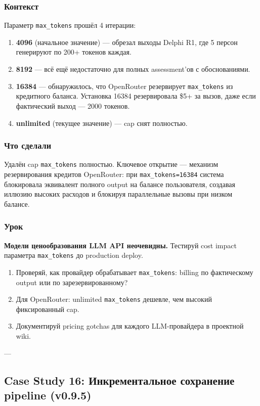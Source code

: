\subsubsection*{Контекст}
Параметр \texttt{max\_tokens} прошёл 4 итерации:
\begin{enumerate}
\item \textbf{4096} (начальное значение) --- обрезал выходы Delphi R1, где 5 персон генерируют по 200+ токенов каждая.
\item \textbf{8192} --- всё ещё недостаточно для полных assessment'ов с обоснованиями.
\item \textbf{16384} --- обнаружилось, что OpenRouter резервирует \texttt{max\_tokens} из кредитного баланса. Установка 16384 резервировала \$5+ за вызов, даже если фактический выход --- 2000 токенов.
\item \textbf{unlimited} (текущее значение) --- cap снят полностью.
\end{enumerate}

\subsubsection*{Что сделали}
Удалён cap \texttt{max\_tokens} полностью. Ключевое открытие --- механизм резервирования кредитов OpenRouter: при \texttt{max\_tokens=16384} система блокировала эквивалент полного output на балансе пользователя, создавая иллюзию высоких расходов и блокируя параллельные вызовы при низком балансе.

\subsubsection*{Урок}
\textbf{Модели ценообразования LLM API неочевидны.} Тестируй cost impact параметра \texttt{max\_tokens} до production deploy.

\begin{enumerate}
\item Проверяй, как провайдер обрабатывает \texttt{max\_tokens}: billing по фактическому output или по зарезервированному?
\item Для OpenRouter: unlimited \texttt{max\_tokens} дешевле, чем высокий фиксированный cap.
\item Документируй pricing gotchas для каждого LLM-провайдера в проектной wiki.
\end{enumerate}

---

\subsection{Case Study 16: Инкрементальное сохранение pipeline (v0.9.5)}

